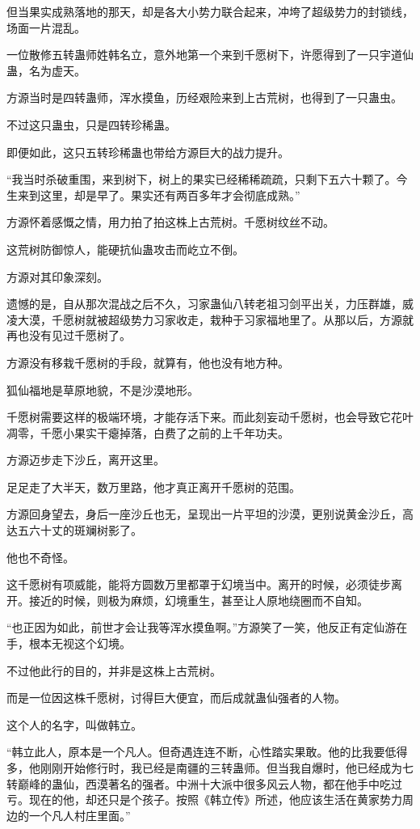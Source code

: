 \begin{this_body}
但当果实成熟落地的那天，却是各大小势力联合起来，冲垮了超级势力的封锁线，场面一片混乱。

一位散修五转蛊师姓韩名立，意外地第一个来到千愿树下，许愿得到了一只宇道仙蛊，名为虚天。

方源当时是四转蛊师，浑水摸鱼，历经艰险来到上古荒树，也得到了一只蛊虫。

不过这只蛊虫，只是四转珍稀蛊。

即便如此，这只五转珍稀蛊也带给方源巨大的战力提升。

“我当时杀破重围，来到树下，树上的果实已经稀稀疏疏，只剩下五六十颗了。今生来到这里，却是早了。果实还有两百多年才会彻底成熟。”

方源怀着感慨之情，用力拍了拍这株上古荒树。千愿树纹丝不动。

这荒树防御惊人，能硬抗仙蛊攻击而屹立不倒。

方源对其印象深刻。

遗憾的是，自从那次混战之后不久，习家蛊仙八转老祖习剑平出关，力压群雄，威凌大漠，千愿树就被超级势力习家收走，栽种于习家福地里了。从那以后，方源就再也没有见过千愿树了。

方源没有移栽千愿树的手段，就算有，他也没有地方种。

狐仙福地是草原地貌，不是沙漠地形。

千愿树需要这样的极端环境，才能存活下来。而此刻妄动千愿树，也会导致它花叶凋零，千愿小果实干瘪掉落，白费了之前的上千年功夫。

方源迈步走下沙丘，离开这里。

足足走了大半天，数万里路，他才真正离开千愿树的范围。

方源回身望去，身后一座沙丘也无，呈现出一片平坦的沙漠，更别说黄金沙丘，高达五六十丈的斑斓树影了。

他也不奇怪。

这千愿树有项威能，能将方圆数万里都罩于幻境当中。离开的时候，必须徒步离开。接近的时候，则极为麻烦，幻境重生，甚至让人原地绕圈而不自知。

“也正因为如此，前世才会让我等浑水摸鱼啊。”方源笑了一笑，他反正有定仙游在手，根本无视这个幻境。

不过他此行的目的，并非是这株上古荒树。

而是一位因这株千愿树，讨得巨大便宜，而后成就蛊仙强者的人物。

这个人的名字，叫做韩立。

“韩立此人，原本是一个凡人。但奇遇连连不断，心性踏实果敢。他的比我要低得多，他刚刚开始修行时，我已经是南疆的三转蛊师。但当我自爆时，他已经成为七转巅峰的蛊仙，西漠著名的强者。中洲十大派中很多风云人物，都在他手中吃过亏。现在的他，却还只是个孩子。按照《韩立传》所述，他应该生活在黄家势力周边的一个凡人村庄里面。”


\end{this_body}
